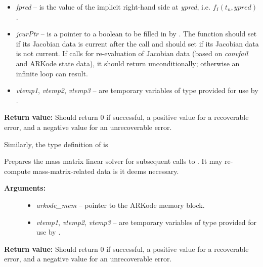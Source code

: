\documentclass[letterpaper,10pt,english]{sphinxmanual}
\begin{document}
\begin{fulllineitems}
\begin{description}
\begin{itemize}
\item {} 
\emph{fpred} -- is the value of the implicit right-hand side at
\emph{ypred}, i.e. $f_I(t_n,ypred)$.

\item {} 
\emph{jcurPtr} -- is a pointer to a boolean to be filled in by
{\hyperref[linear_solvers/custom:lsetup]{}}. The function should set 
if its Jacobian data is current after the call and should set
 if its Jacobian data is not current. If
{\hyperref[linear_solvers/custom:lsetup]{}} calls for re-evaluation of Jacobian data
(based on \emph{convfail} and ARKode state data), it should return
 unconditionally; otherwise an infinite
loop can result.

\item {} 
\emph{vtemp1}, \emph{vtemp2}, \emph{vtemp3} -- are temporary variables of
type  provided for use by {\hyperref[linear_solvers/custom:lsetup]{}}.

\end{itemize}

\end{description}

\textbf{Return value:}
Should return 0 if successful, a positive value
for a recoverable error, and a negative value for an unrecoverable
error.

\end{fulllineitems}


Similarly, the type definition of {\hyperref[linear_solvers/custom:msetup]{}} is

\begin{fulllineitems}
\label{linear_solvers/custom:msetup}
Prepares the mass matrix linear solver for subsequent calls to
{\hyperref[linear_solvers/custom:msolve]{}}. It may re-compute mass-matrix-related data is
it deems necessary.
\begin{description}
\item[{\textbf{Arguments:}}] \leavevmode\begin{itemize}
\item {} 
\emph{arkode\_mem} -- pointer to the ARKode memory block.

\item {} 
\emph{vtemp1}, \emph{vtemp2}, \emph{vtemp3} -- are temporary variables of
type  provided for use by {\hyperref[linear_solvers/custom:msetup]{}}.

\end{itemize}

\end{description}

\textbf{Return value:}
Should return 0 if successful, a positive value
for a recoverable error, and a negative value for an unrecoverable
error.

\end{fulllineitems}
\end{document}

